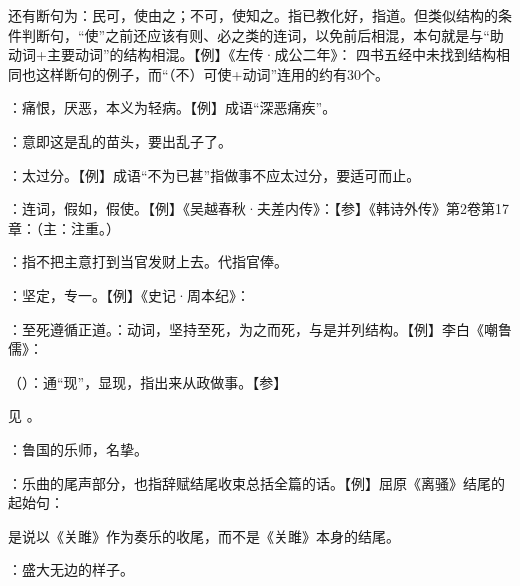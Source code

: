 {还有断句为：民可，使由之；不可，使知之。指已教化好，指道。但类似结构的条件判断句，“使”之前还应该有则、必之类的连词，以免前后相混，本句就是与“助动词+主要动词”的结构相混。【例】《左传·成公二年》： 四书五经中未找到结构相同也这样断句的例子，而“（不）可使+动词”连用的约有30个。
}
{}


{
\item {}：痛恨，厌恶，本义为轻病。【例】成语“深恶痛疾”。
\item {}：意即这是乱的苗头，要出乱子了。
\item {}：太过分。【例】成语“不为已甚”指做事不应太过分，要适可而止。%
}
{}


{
\item {}：连词，假如，假使。【例】《吴越春秋·夫差内传》：【参】《韩诗外传》第2卷第17章：（主：注重。）
}
{}


{
\item {}：指不把主意打到当官发财上去。代指官俸。
}
{}  %


{
\item {}：坚定，专一。【例】《史记·周本纪》：
\item {}：至死遵循正道。：动词，坚持至死，为之而死，与是并列结构。【例】李白《嘲鲁儒》：
\item {}（）：通“现”，显现，指出来从政做事。【参】
}
{}


{见 。}
{}


{
\item {}：鲁国的乐师，名挚。
\item {}：乐曲的尾声部分，也指辞赋结尾收束总括全篇的话。【例】屈原《离骚》结尾的起始句：

是说以《关雎》作为奏乐的收尾，而不是《关雎》本身的结尾。
\item {}：盛大无边的样子。
}
{}


